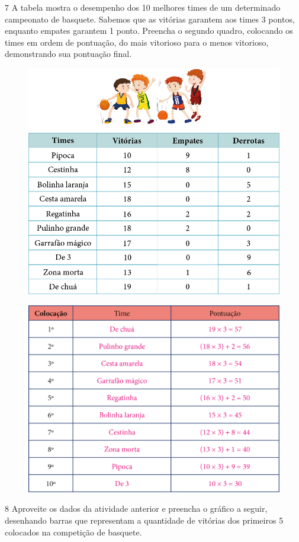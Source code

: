 \num{7} A tabela mostra o desempenho dos 10 melhores times de um
determinado campeonato de basquete. Sabemos que as vitórias garantem aos
times 3 pontos, enquanto empates garantem 1 ponto. Preencha o segundo quadro,
colocando os times em ordem de pontuação, do mais vitorioso para o menos
vitorioso, demonstrando sua pontuação final.


\begin{figure}[htpb!]
\centering
\includegraphics[width=.65\textwidth]{./media/image94.png}
\end{figure}

\begin{figure}[htpb!]
\centering
\includegraphics[width=.7\textwidth]{./media/image95.png}
\end{figure}

\pagebreak
\num{8} Aproveite os dados da atividade anterior e preencha o gráfico a seguir,
desenhando barras que representam a quantidade de vitórias dos primeiros
5 colocados na competição de basquete.

